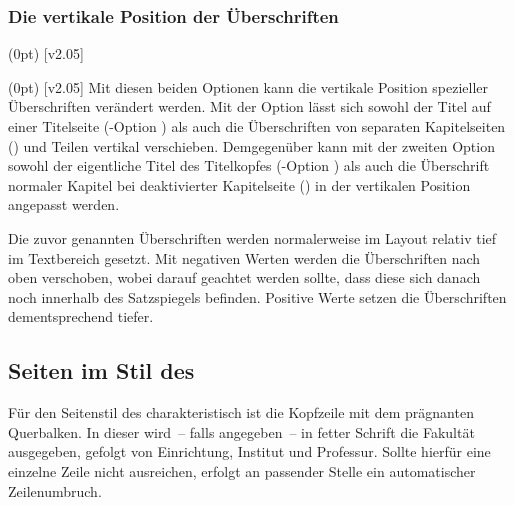 \begin{DeclareEntity*}{}
\begin{DeclareEntity*}{}
\begin{DeclareEntity*}{}
\subsubsection{Die vertikale Position der Überschriften}
%
\begin{Declaration}
  {}
  (0pt)
  [v2.05]
\begin{Declaration}
  {}
  (0pt)
  [v2.05]
Mit diesen beiden Optionen kann die vertikale Position spezieller Überschriften 
verändert werden. Mit der Option  lässt sich sowohl 
der Titel auf einer Titelseite (\KOMAScript-Option ) als 
auch die Überschriften von separaten Kapitelseiten () 
und Teilen vertikal verschieben. Demgegenüber kann mit der zweiten Option 
 sowohl der eigentliche Titel des Titelkopfes 
(\KOMAScript-Option ) als auch die Überschrift normaler 
Kapitel bei deaktivierter Kapitelseite () in der 
vertikalen Position angepasst werden.

Die zuvor genannten Überschriften werden normalerweise im Layout relativ tief 
im Textbereich gesetzt. Mit negativen Werten werden die Überschriften nach oben 
verschoben, wobei darauf geachtet werden sollte, dass diese sich danach noch 
innerhalb des Satzspiegels befinden. Positive Werte setzen die Überschriften 
dementsprechend tiefer.%
%
\end{Declaration}
\end{Declaration}



\subsection{%
  Seiten im Stil des \CDs%
  \label{sec:tudheadings}%
}
%
\begin{Declaration}
  {}
\begin{Declaration}
  {}
\begin{Declaration}
  {}
\begin{Declaration}
  {}
\begin{Declaration}
  {}
Für den Seitenstil des \TUDCDs charakteristisch ist die Kopfzeile mit dem 
prägnanten Querbalken. In dieser wird~-- falls angegeben~-- in fetter Schrift 
die Fakultät ausgegeben, gefolgt von Einrichtung, Institut und Professur. 
Sollte hierfür eine einzelne Zeile nicht ausreichen, erfolgt an passender 
Stelle ein automatischer Zeilenumbruch.


\end{Declaration}
\end{Declaration}
\end{Declaration}
\end{Declaration}
\end{Declaration}
\end{DeclareEntity*}
\end{DeclareEntity*}
\end{DeclareEntity*}
